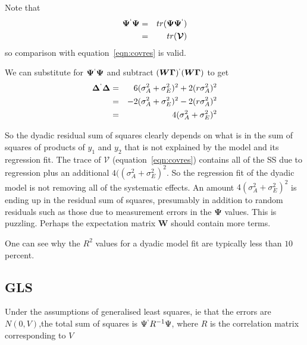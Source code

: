 \documentclass[titlepage,a4paper,12pt]{article}  %
\begin{document}
Note that 
\begin{eqnarray*}
\bm{\Psi}^{`}\bm{\Psi} & = & tr(\bm{\Psi}\bm{\Psi}^{`}) \\
                       & = & tr(\bm{\mathcal{V}})
\end{eqnarray*}
so comparison with equation~\ref{eqn:covres} is valid. 

We can substitute for $\bm{\Psi}^{`}\bm{\Psi}$ and subtract $(\bm{W}\bm{\Gamma})^{`} (\bm{W}\bm{\Gamma})$ to get
\begin{eqnarray*}
\bm{\Delta}^{`} \bm{\Delta} & = & 6(\sigma^{2}_{A} + \sigma^{2}_{E})^{2} + 2(r \sigma^{2}_{A})^{2} \\
   & = & - 2(\sigma^{2}_{A} + \sigma^{2}_{E})^{2} - 2(r \sigma^{2}_{A})^{2} \\
   & = &  4(\sigma^{2}_{A} + \sigma^{2}_{E})^{2}
\end{eqnarray*}


So the dyadic residual sum of squares clearly depends on what is in the sum of squares of products of $y_{1}$ and $y_{2}$ that is not explained by the model and its regression fit.  The trace of $\bm{\mathcal{V}}$ (equation~\ref{eqn:covres}) contains all of the SS due to regression plus an additional $4((\sigma^{2}_{A} + \sigma^{2}_{E})^{2}$. So the regression fit of the dyadic model is not removing all of the systematic effects. An amount $4(\sigma^{2}_{A} + \sigma^{2}_{E})^{2}$ is ending up in the residual sum of squares, presumably in addition to random residuals such as those due to measurement errors in the $\bm{\Psi}$ values. This is puzzling. Perhaps the expectation matrix $\bm{W}$ should contain more terms. 

One can see why the $R^{2}$ values for a dyadic model fit are typically less than $10$ percent.




\subsection{GLS}
Under the assumptions of generalised least squares, ie that the errors are $N(0,V)$,the total sum of squares is $\Psi^{`} R^{-1} \Psi$, where $R$ is the correlation matrix corresponding to $V$  
\end{document}
